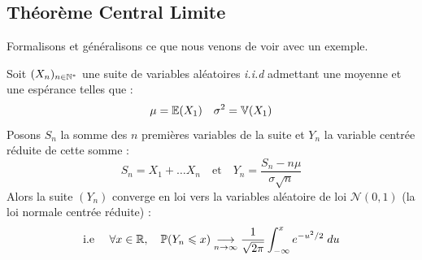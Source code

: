 \subsection{Théorème Central Limite}

Formalisons et généralisons ce que nous venons de voir avec un exemple. 

\begin{theorem}
    Soit $(X_n)_{n \in \mathbb{N}^*}$ une suite de variables aléatoires \emph{i.i.d} admettant une moyenne et 
    une espérance telles que : 
        \[ \mu = \mathbb{E}(X_1) \quad \sigma^2 = \mathbb{V}(X_1) \] 
    Posons $S_n$ la somme des $n$ premières variables de la suite et $Y_n$ la variable centrée réduite de cette somme : 
        \[ S_n = X_1 + \dots X_n \quad \text{et} \quad Y_n = \frac{S_n - n \mu}{\sigma \sqrt{n}} \]
    Alors la suite $(Y_n)$ converge en loi vers la variables aléatoire de loi $ \mathcal{N}(0,1)$ 
    (la loi normale centrée réduite) :
        \[ \text{i.e } \quad \forall x \in \mathbb{R}, \quad \mathbb{P}(Y_n \leqslant x) \underset{n \to \infty}{\longrightarrow} \frac{1}{\sqrt{2 \pi}} \int_{- \infty}^{x} e^{-u^2/2} \; du \] 
\end{theorem}

